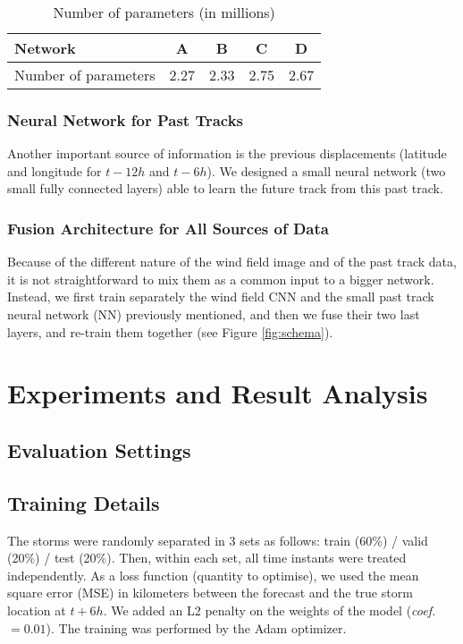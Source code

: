 \begin{table}[]
	\centering
	\caption{Number of parameters (in millions)}
	\begin{tabular}{|l|c|c|c|c|}
		\hline
		Network              & A    & B    & C    & D    \\ \hline
		Number of parameters & 2.27 & 2.33 & 2.75 & 2.67 \\ \hline
	\end{tabular}
\end{table}

\subsection{Neural Network for Past Tracks}
Another important source of information is the previous displacements
(latitude and longitude
for $t-12h$ and $t-6h$). We designed a small neural network (two small fully connected layers) able to learn the future track from this past track.

\subsection{Fusion Architecture for All Sources of Data}

Because of the different nature of the wind field image and of the past track data, it is not straightforward to mix them as a common input to a bigger network. Instead, we first train separately the wind field CNN and the small past track neural network (NN) previously mentioned, and then we fuse their two last layers, and re-train them together (see Figure \ref{fig:schema}). %

\chapter{Experiments and Result Analysis}
\section{Evaluation Settings}

\section{Training Details}
The storms were randomly separated in 3 sets as follows: train (60\%) / valid (20\%) / test (20\%).
Then, within each set, all time instants were treated independently.
As a loss function (quantity to optimise), we used the mean square error (MSE) in kilometers between the forecast and the true storm location at $t+6h$. We added an L2 penalty on the weights of the model (\emph{coef.}~$= 0.01$). The training was performed by the Adam optimizer.

